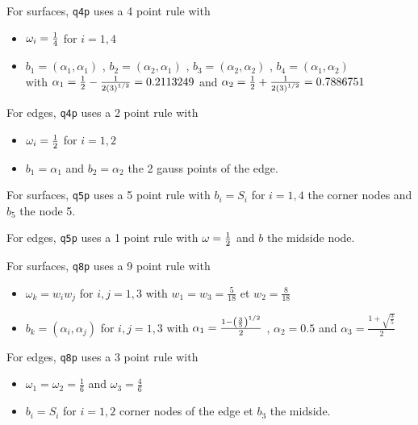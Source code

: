 For surfaces, {\tt q4p} uses a 4 point rule with 
\begin{itemize} 
 \item $\omega_i = {1 \over 4}$ for $i=1,4$
 \item $b_1 = (\alpha_1,\alpha_1)$ , $b_2 = (\alpha_2,\alpha_1)$ , $b_3 = (\alpha_2,\alpha_2)$ , 
      $b_4 = (\alpha_1,\alpha_2)$ \\ 
      with   $\alpha_1 = {1 \over 2} - { 1 \over {2 \sqrt{3}} } = 0.2113249 $ and
      $\alpha_2 = {1 \over 2} + { 1 \over {2 \sqrt{3}} } = 0.7886751 $
\end{itemize}

For edges, {\tt q4p} uses a 2 point rule with 
\begin{itemize} 
    \item $\omega_i = {1 \over 2}$ for $i=1,2$
    \item $b_1= \alpha_1$  and $b_2 = \alpha_2 $ the 2 gauss points of the edge.
\end{itemize}


For surfaces, {\tt q5p} uses a 5 point rule with $b_i=S_i$ for $i=1,4$ the corner nodes and $b_5$ the node 5. 

For edges, {\tt q5p} uses a 1 point rule with $\omega = {1 \over 2}$ and  $b$  the midside node.


For surfaces, {\tt q8p} uses a 9 point rule with 
  \begin{itemize} 
     \item $\omega_k = w_i w_j$ for $i,j=1,3$ 
           with $w_1 = w_3 = \frac{5}{18} $ et $w_2 = \frac{8}{18} $
     \item $b_k =  (\alpha_i, \alpha_j) $ for $i,j=1,3$ 
           with   $ \alpha_1 = { { 1 - \sqrt{\frac{3}{5}} } \over 2 } $ ,
           $ \alpha_2 = 0.5 $ and
           $ \alpha_3 =  \frac{ 1 + \sqrt{\frac{3}{5}}} {2} $
  \end{itemize}

For edges, {\tt q8p} uses a 3 point rule with 
 
  \begin{itemize} 
     \item $\omega_1 = \omega_2 = \frac{1}{6}$ and $ \omega_3 = \frac{4}{6} $
     \item $b_i=S_i$ for $i=1,2$ corner nodes of the edge et $b_3$ the midside.
  \end{itemize}

